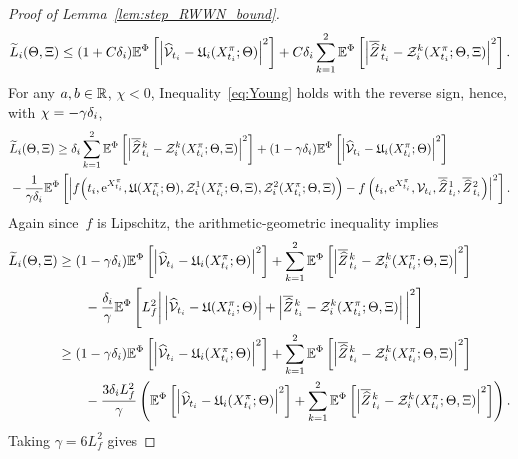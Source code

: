 \begin{proof}[Proof of Lemma~\ref{lem:step_RWWN_bound}]
    \begin{equation*}
        \widetilde{L}_i(\Theta, \Xi) \leq (1 + C\delta_{i} ) \mathbb{E}^\Phi\left[\left\lvert \widehat {\mathcal{V}}_{t_i} - \mathfrak{U}_i(X^\pi_{t_i}; \Theta)\right\rvert^2\right] + C\delta_{i} \sum_{k=1}^2\mathbb{E}^\Phi\left[ \left\lvert \overline{\widehat{Z}}\kern0.1em^{k}_{t_{i}} - \mathcal{Z}_i^k(X^\pi_{t_i}; \Theta, \Xi)\right\rvert^2\right].
    \end{equation*}
    For any $a, b\in\mathbb{R}$, $\chi<0$, Inequality~\eqref{eq:Young} holds with the reverse sign, hence, with $\chi = -\gamma\delta_{i}$,
    \begin{align*}
        & \widetilde{L}_i(\Theta, \Xi) \geq \delta_{i} \sum_{k=1}^2\mathbb{E}^\Phi\left[ \left\lvert \overline{\widehat{Z}}\kern0.1em^{k}_{t_{i}} - \mathcal{Z}_i^k(X^\pi_{t_i}; \Theta, \Xi)\right\rvert^2\right] + (1 - \gamma\delta_{i} ) \mathbb{E}^\Phi\left[\left\lvert \widehat {\mathcal{V}}_{t_i} - \mathfrak{U}_i(X^\pi_{t_i}; \Theta)\right\rvert^2\right] \\
        & - \frac1{\gamma\delta_{i} }\mathbb{E}^\Phi\left[\left\lvert  f\Big(t_i, \mathrm{e}^{X^\pi_{t_i}}, \mathfrak{U}(X^\pi_{t_i}; \Theta), \mathcal{Z}^1_i(X^\pi_{t_i}; \Theta, \Xi), \mathcal{Z}^2_i(X^\pi_{t_i}; \Theta, \Xi)\Big) - f\left(t_i, \mathrm{e}^{X^\pi_{t_i}}, \mathcal{V}_{t_i}, \overline{\widehat{Z}}\kern0.1em^{1}_{t_{i}}, \overline{\widehat{Z}}\kern0.1em^{2}_{t_{i}}\right) \right\rvert^2\right].
    \end{align*}
    Again since~$f$ is Lipschitz, the arithmetic-geometric inequality implies
    \begin{align*}
        \widetilde{L}_i(\Theta, \Xi) 
        &\geq (1 - \gamma\delta_{i} ) \mathbb{E}^\Phi\left[\left\lvert \widehat {\mathcal{V}}_{t_i} - \mathfrak{U}_i(X^\pi_{t_i}; \Theta)\right\rvert^2\right] + \sum_{k=1}^2\mathbb{E}^\Phi\left[ \left\lvert \overline{\widehat{Z}}\kern0.1em^{k}_{t_{i}} - \mathcal{Z}_i^k(X^\pi_{t_i}; \Theta, \Xi)\right\rvert^2\right]\\
        & \qquad - \frac{\delta_{i}}\gamma\mathbb{E}^\Phi\left[ L_f^2 \bigg\lvert \left\lvert \widehat{\mathcal{V}}_{t_i} - \mathfrak{U}(X^\pi_{t_i}; \Theta)\right\rvert  + \left\lvert \overline{\widehat{Z}}\kern0.1em^{k}_{t_{i}} - \mathcal{Z}_i^k(X^\pi_{t_i}; \Theta, \Xi)\right\rvert\bigg\rvert^2\right] \\ 
        &\geq (1 - \gamma\delta_{i} ) \mathbb{E}^\Phi\left[\left\lvert \widehat {\mathcal{V}}_{t_i} - \mathfrak{U}_i(X^\pi_{t_i}; \Theta)\right\rvert^2\right] + \sum_{k=1}^2\mathbb{E}^\Phi\left[ \left\lvert \overline{\widehat{Z}}\kern0.1em^{k}_{t_{i}} - \mathcal{Z}_i^k(X^\pi_{t_i}; \Theta, \Xi)\right\rvert^2\right]\\
        & \qquad - \frac{3\delta_{i}  L_f^2}{\gamma}\left( \mathbb{E}^\Phi\left[\left\lvert \widehat {\mathcal{V}}_{t_i} - \mathfrak{U}_i(X^\pi_{t_i}; \Theta)\right\rvert^2\right] + \sum_{k=1}^2\mathbb{E}^\Phi\left[ \left\lvert \overline{\widehat{Z}}\kern0.1em^{k}_{t_{i}} - \mathcal{Z}_i^k(X^\pi_{t_i}; \Theta, \Xi)\right\rvert^2\right] \right).
    \end{align*}
    Taking $\gamma=6L_f^2$ gives

\end{proof}

